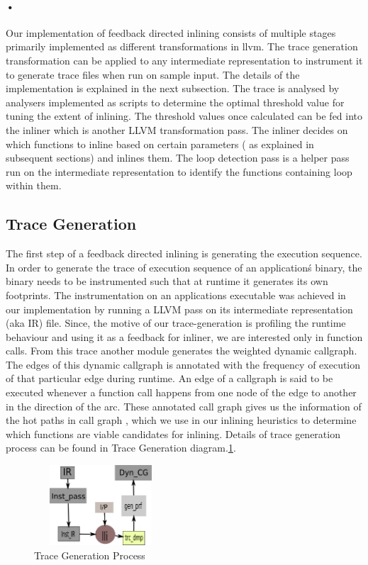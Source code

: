 \documentclass{sigplanconf}
\begin{document}
	\paragraph{•}
	Our implementation of feedback directed inlining consists of multiple stages primarily implemented as different transformations in llvm. The trace generation transformation can be applied to any intermediate representation to instrument it to generate trace files when run on sample input. The details of the implementation is explained in the next subsection. The trace is analysed by analysers implemented as scripts  to determine the optimal threshold value for tuning the extent of inlining. The threshold values once calculated can be fed into the inliner which is another LLVM transformation pass.  The inliner decides on which functions to inline based on certain parameters ( as explained in subsequent sections) and inlines them. The loop detection pass is a helper pass run on the intermediate representation to identify the functions containing loop within them.  
\subsection{Trace Generation}
	The first step of a feedback directed inlining is generating the execution sequence. In order to generate the  trace of execution sequence of an application\' s binary, the binary needs to be instrumented such that at runtime it generates its own footprints. The instrumentation on an applications executable was achieved in our implementation by running a LLVM pass on its intermediate representation (aka IR) file. Since, the motive of our trace-generation is profiling the runtime behaviour and using it as a feedback for inliner, we are interested only in function calls. From this trace another module generates the weighted dynamic callgraph. The edges of this dynamic callgraph is annotated with the frequency of execution of that particular edge during runtime. An edge of a callgraph is said to be executed whenever a function call happens from one node of the edge to another in the direction of the arc. These annotated call graph gives us the information of the hot paths in call graph , which we use in our inlining heuristics to determine which functions are viable candidates for inlining. Details of trace generation process can be found in Trace Generation diagram.\ref{TraceGen}.
	\begin{figure}
	 \begin{center}
		 \includegraphics[width=50mm,height=30mm]{design.png} 
	 \end{center}
	 \caption{Trace Generation Process}
	 \label{TraceGen}
 \end{figure}
\end{document}
